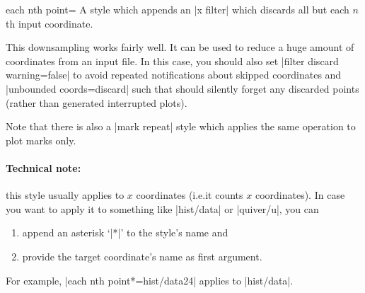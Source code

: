 \begin{pgfplotskey}{each nth point=}
    A style which appends an |x filter| which discards all but each $n$th input
    coordinate.

    This downsampling works fairly well. It can be used to reduce a huge amount
    of coordinates from an input file. In this case, you should also set
    |filter discard warning=false| to avoid repeated notifications about
    skipped coordinates and |unbounded coords=discard| such that \PGFPlots{}
    should silently forget any discarded points (rather than generated
    interrupted plots).

    Note that there is also a |mark repeat| style which applies the same
    operation to plot marks only.


    \paragraph{Technical note:}

    this style usually applies to $x$ coordinates (i.e.\@ it counts $x$
    coordinates). In case you want to apply it to something like |hist/data| or
    |quiver/u|, you can
    \begin{enumerate}
        \item append an asterisk `|*|' to the style's name and
        \item provide the target coordinate's name as first argument.
    \end{enumerate}
    For example, |each nth point*={hist/data}{2}{4}| applies to |hist/data|.
\end{pgfplotskey}

